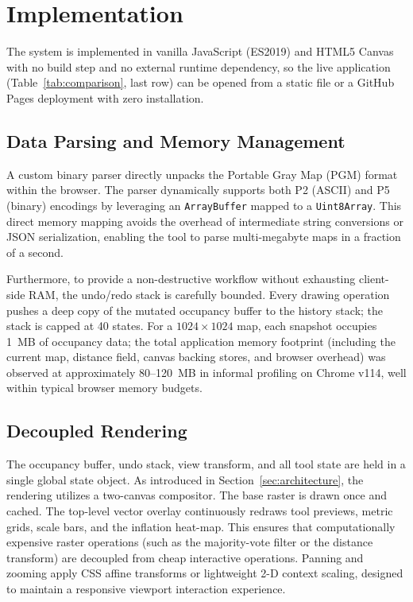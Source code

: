 \documentclass{IEEE_lsens}
\begin{document}
\section{Implementation}
\label{sec:implementation}
The system is implemented in vanilla JavaScript (ES2019) and HTML5 Canvas with no build step and no external runtime dependency, so the live application (Table~\ref{tab:comparison}, last row) can be opened from a static file or a GitHub Pages deployment with zero installation. 

\subsection{Data Parsing and Memory Management}
A custom binary parser directly unpacks the Portable Gray Map (PGM) format within the browser. The parser dynamically supports both P2 (ASCII) and P5 (binary) encodings by leveraging an \texttt{ArrayBuffer} mapped to a \texttt{Uint8Array}. This direct memory mapping avoids the overhead of intermediate string conversions or JSON serialization, enabling the tool to parse multi-megabyte maps in a fraction of a second.

Furthermore, to provide a non-destructive workflow without exhausting client-side RAM, the undo/redo stack is carefully bounded. Every drawing operation pushes a deep copy of the mutated occupancy buffer to the history stack; the stack is capped at 40 states. For a $1024 \times 1024$ map, each snapshot occupies 1~MB of occupancy data; the total application memory footprint (including the current map, distance field, canvas backing stores, and browser overhead) was observed at approximately 80--120~MB in informal profiling on Chrome v114, well within typical browser memory budgets.

\subsection{Decoupled Rendering}
The occupancy buffer, undo stack, view transform, and all tool state are held in a single global state object. As introduced in Section~\ref{sec:architecture}, the rendering utilizes a two-canvas compositor. The base raster is drawn once and cached. The top-level vector overlay continuously redraws tool previews, metric grids, scale bars, and the inflation heat-map. This ensures that computationally expensive raster operations (such as the majority-vote filter or the distance transform) are decoupled from cheap interactive operations. Panning and zooming apply CSS affine transforms or lightweight 2-D context scaling, designed to maintain a responsive viewport interaction experience.
\end{document}
